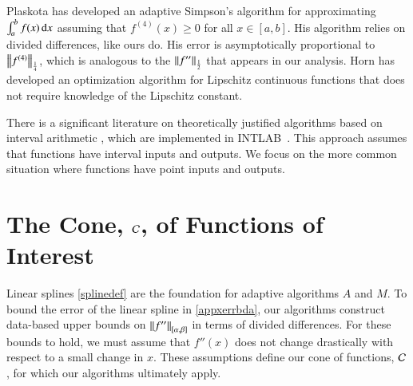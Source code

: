 \documentclass[review]{elsarticle}
\theoremstyle{definition}
\begin{document}
Plaskota \cite{Pla15a} has developed an adaptive Simpson's algorithm for
approximating $\int_a^b f(x) \, \dif x$ assuming that $f^{(4)}(x) \ge 0$ for all
$x \in [a,b]$. His algorithm relies on divided differences, like ours do. His
error is asymptotically proportional to $\norm[\frac14]{f^{(4)}}$, which is
analogous to the $\norm[\frac12]{f''}$ that appears in our analysis.  Horn \cite{Hor06a} 
has developed an optimization algorithm for Lipschitz continuous functions that does not 
require knowledge of the Lipschitz constant.

There is a significant literature on theoretically justified algorithms based on
interval arithmetic \cite{MoKeCl09, Rum10a}, which are implemented in
INTLAB~\cite{Rum99a}. This approach assumes that functions have interval inputs
and outputs. We focus on the more common situation where functions have point
inputs and outputs.

\section{The Cone, $\cc$, of Functions of Interest} \label{sec:cone}

Linear splines \eqref{splinedef} are the foundation for adaptive algorithms $A$
and $M$. To bound the error of the linear spline in \eqref{appxerrbda}, our
algorithms construct data-based upper bounds on $\norm[{[\alpha, \beta]}]{f''}$
in terms of divided differences. For these bounds to hold, we must assume that
$f''(x)$ does not change drastically with respect to a small change in $x$.
These assumptions define our cone of functions, $\cc$, for which our algorithms
ultimately apply.
\end{document}
